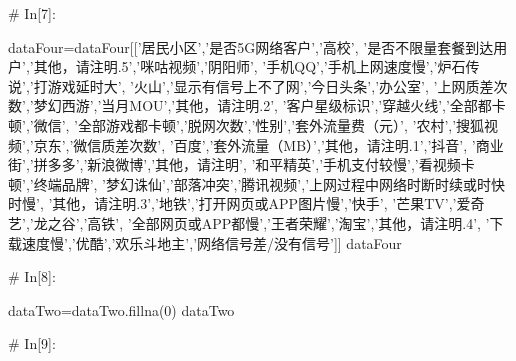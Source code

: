 \documentclass{MathorCupmodeling}
\begin{document}
\begin{python}
# In[7]:


dataFour=dataFour[['居民小区','是否5G网络客户','高校',
                   '是否不限量套餐到达用户','其他，请注明.5','咪咕视频','阴阳师',
                   '手机QQ','手机上网速度慢','炉石传说','打游戏延时大',
                   '火山','显示有信号上不了网','今日头条','办公室',
                   '上网质差次数','梦幻西游','当月MOU','其他，请注明.2',
                   '客户星级标识','穿越火线','全部都卡顿','微信',
                   '全部游戏都卡顿','脱网次数','性别','套外流量费（元）',
                   '农村','搜狐视频','京东','微信质差次数',
                   '百度','套外流量（MB）','其他，请注明.1','抖音',
                   '商业街','拼多多','新浪微博','其他，请注明',
                   '和平精英','手机支付较慢','看视频卡顿','终端品牌',
                   '梦幻诛仙','部落冲突','腾讯视频','上网过程中网络时断时续或时快时慢',
                   '其他，请注明.3','地铁','打开网页或APP图片慢','快手',
                   '芒果TV','爱奇艺','龙之谷','高铁',
                   '全部网页或APP都慢','王者荣耀','淘宝','其他，请注明.4',
                   '下载速度慢','优酷','欢乐斗地主','网络信号差/没有信号']]
dataFour


# In[8]:


dataTwo=dataTwo.fillna(0)
dataTwo


# In[9]:



\end{python}
\end{document}
